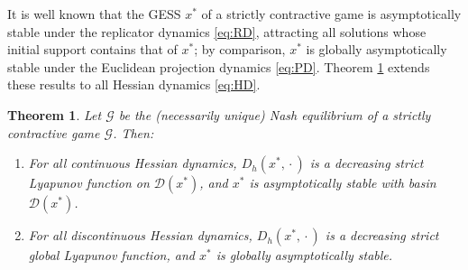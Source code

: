 \documentclass[reqno]{amsart}
\theoremstyle{plain}
\newtheorem{theorem}{Theorem}
\theoremstyle{definition}
\theoremstyle{remark}
\numberwithin{equation}{section}
\numberwithin{theorem}{section}
\begin{document}
It is well known that the \ac{GESS} ${x^{\ast}}$ of a strictly contractive game
is asymptotically stable under the replicator dynamics \eqref{eq:RD}, attracting all solutions whose initial support contains that of ${x^{\ast}}$;
by comparison, ${x^{\ast}}$ is globally asymptotically stable under the Euclidean projection dynamics \eqref{eq:PD}.
Theorem \ref{thm:contractive} extends these results to all Hessian dynamics \eqref{eq:HD}.

\begin{theorem}
\label{thm:contractive}
Let ${\mathcal{G}}$ be the \textup(necessarily unique\textup) Nash equilibrium of a strictly contractive game ${\mathcal{G}}$.
Then:
\begin{enumerate}

\item
For all continuous Hessian dynamics, ${D_{h}}({x^{\ast}},{\mathopen{}\cdot\mathopen{}})$ is a decreasing strict Lyapunov function on ${\mathcal{D}}({x^{\ast}})$, and ${x^{\ast}}$ is asymptotically stable with basin ${\mathcal{D}}({x^{\ast}})$.

\item
For all discontinuous Hessian dynamics, ${D_{h}}({x^{\ast}},{\mathopen{}\cdot\mathopen{}})$ is a decreasing strict global Lyapunov function, and ${x^{\ast}}$ is globally asymptotically stable.
\end{enumerate}
\end{theorem}
\end{document}
